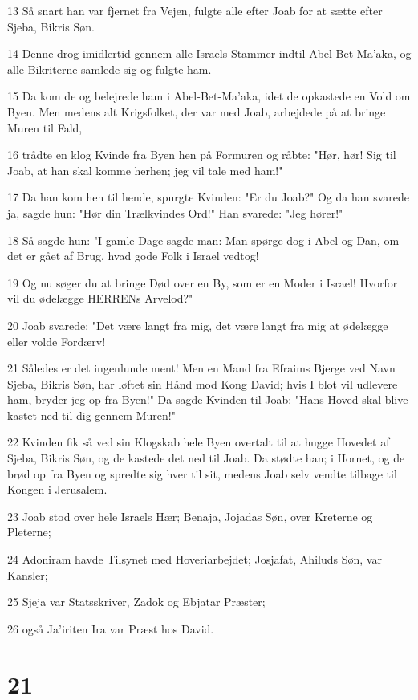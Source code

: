 \par 13 Så snart han var fjernet fra Vejen, fulgte alle efter Joab for at sætte efter Sjeba, Bikris Søn.
\par 14 Denne drog imidlertid gennem alle Israels Stammer indtil Abel-Bet-Ma'aka, og alle Bikriterne samlede sig og fulgte ham.
\par 15 Da kom de og belejrede ham i Abel-Bet-Ma'aka, idet de opkastede en Vold om Byen. Men medens alt Krigsfolket, der var med Joab, arbejdede på at bringe Muren til Fald,
\par 16 trådte en klog Kvinde fra Byen hen på Formuren og råbte: "Hør, hør! Sig til Joab, at han skal komme herhen; jeg vil tale med ham!"
\par 17 Da han kom hen til hende, spurgte Kvinden: "Er du Joab?" Og da han svarede ja, sagde hun: "Hør din Trælkvindes Ord!" Han svarede: "Jeg hører!"
\par 18 Så sagde hun: "I gamle Dage sagde man: Man spørge dog i Abel og Dan, om det er gået af Brug, hvad gode Folk i Israel vedtog!
\par 19 Og nu søger du at bringe Død over en By, som er en Moder i Israel! Hvorfor vil du ødelægge HERRENs Arvelod?"
\par 20 Joab svarede: "Det være langt fra mig, det være langt fra mig at ødelægge eller volde Fordærv!
\par 21 Således er det ingenlunde ment! Men en Mand fra Efraims Bjerge ved Navn Sjeba, Bikris Søn, har løftet sin Hånd mod Kong David; hvis I blot vil udlevere ham, bryder jeg op fra Byen!" Da sagde Kvinden til Joab: "Hans Hoved skal blive kastet ned til dig gennem Muren!"
\par 22 Kvinden fik så ved sin Klogskab hele Byen overtalt til at hugge Hovedet af Sjeba, Bikris Søn, og de kastede det ned til Joab. Da stødte han; i Hornet, og de brød op fra Byen og spredte sig hver til sit, medens Joab selv vendte tilbage til Kongen i Jerusalem.
\par 23 Joab stod over hele Israels Hær; Benaja, Jojadas Søn, over Kreterne og Pleterne;
\par 24 Adoniram havde Tilsynet med Hoveriarbejdet; Josjafat, Ahiluds Søn, var Kansler;
\par 25 Sjeja var Statsskriver, Zadok og Ebjatar Præster;
\par 26 også Ja'iriten Ira var Præst hos David.

\chapter{21}

